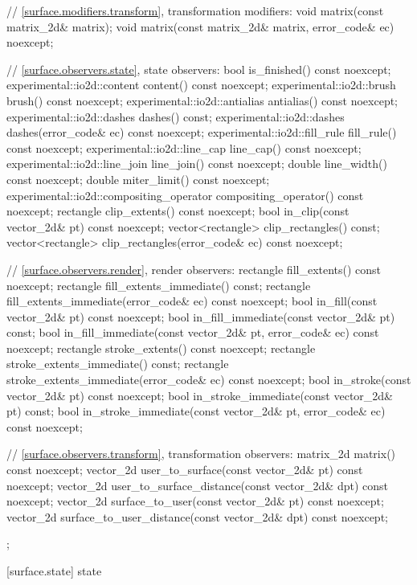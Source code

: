 \begin{codeblock}
{{{{{    // \ref{surface.modifiers.transform}, transformation modifiers:
    void matrix(const matrix_2d& matrix);
    void matrix(const matrix_2d& matrix, error_code& ec) noexcept;
    
    // \ref{surface.observers.state}, state observers:
    bool is_finished() const noexcept;
    experimental::io2d::content content() const noexcept;
    experimental::io2d::brush brush() const noexcept;
    experimental::io2d::antialias antialias() const noexcept;
    experimental::io2d::dashes dashes() const;
    experimental::io2d::dashes dashes(error_code& ec) const noexcept;
    experimental::io2d::fill_rule fill_rule() const noexcept;
    experimental::io2d::line_cap line_cap() const noexcept;
    experimental::io2d::line_join line_join() const noexcept;
    double line_width() const noexcept;
    double miter_limit() const noexcept;
    experimental::io2d::compositing_operator compositing_operator() const
      noexcept;
    rectangle clip_extents() const noexcept;
    bool in_clip(const vector_2d& pt) const noexcept;
    vector<rectangle> clip_rectangles() const;
    vector<rectangle> clip_rectangles(error_code& ec) const noexcept;
    
    // \ref{surface.observers.render}, render observers:
    rectangle fill_extents() const noexcept;
    rectangle fill_extents_immediate() const;
    rectangle fill_extents_immediate(error_code& ec) const noexcept;
    bool in_fill(const vector_2d& pt) const noexcept;
    bool in_fill_immediate(const vector_2d& pt) const;
    bool in_fill_immediate(const vector_2d& pt, error_code& ec) const noexcept;
    rectangle stroke_extents() const noexcept;
    rectangle stroke_extents_immediate() const;
    rectangle stroke_extents_immediate(error_code& ec) const noexcept;
    bool in_stroke(const vector_2d& pt) const noexcept;
    bool in_stroke_immediate(const vector_2d& pt) const;
    bool in_stroke_immediate(const vector_2d& pt, error_code& ec) const 
      noexcept;
    
    // \ref{surface.observers.transform}, transformation observers:
    matrix_2d matrix() const noexcept;
    vector_2d user_to_surface(const vector_2d& pt) const noexcept;
    vector_2d user_to_surface_distance(const vector_2d& dpt) const noexcept;
    vector_2d surface_to_user(const vector_2d& pt) const noexcept;
    vector_2d surface_to_user_distance(const vector_2d& dpt) const noexcept;
  };
} } } }
\end{codeblock}

 [surface.state] { state}


